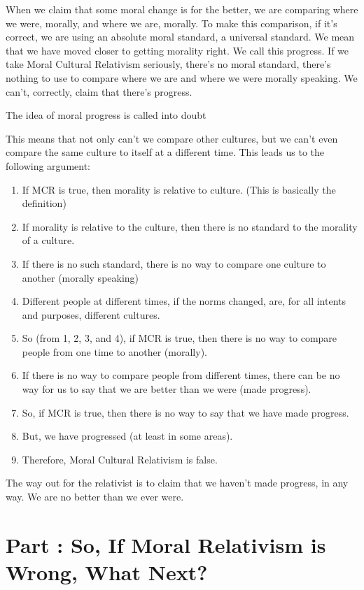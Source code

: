 When we claim that some moral change is for the better, we are comparing where we were, morally, and where we are, morally. To make this comparison, if it's correct, we are using an absolute moral standard, a universal standard. We mean that we have moved closer to getting morality right. We call this progress. If we take Moral Cultural Relativism seriously, there's no moral standard, there's nothing to use to compare where we are and where we were morally speaking. We can't, correctly, claim that there's progress.
\begin{center}
The idea of moral progress is called into doubt
\end{center}
This means that not only can't we compare other cultures, but we can't even compare the same culture to itself at a different time. This leads us to the following argument:
\begin{enumerate}
    \item If MCR is true, then morality is relative to culture. (This is basically the definition)
    \item If morality is relative to the culture, then there is no standard to the morality of a culture.
    \item If there is no such standard, there is no way to compare one culture to another (morally speaking)
    \item Different people at different times, if the norms changed, are, for all intents and purposes, different cultures.
    \item So (from 1, 2, 3, and 4), if MCR is true, then there is no way to compare people from one time to another (morally).
    \item If there is no way to compare people from different times, there can be no way for us to say that we are better than we were (made progress).
    \item So, if MCR is true, then there is no way to say that we have made progress.
    \item But, we have progressed (at least in some areas).
    \item Therefore, Moral Cultural Relativism is false.
\end{enumerate}
The way out for the relativist is to claim that we haven't made progress, in any way. We are no better than we ever were. 
\chapter{Part \thechapcount: So, If Moral Relativism is Wrong, What Next?}\setcounter{seccount}{1}

